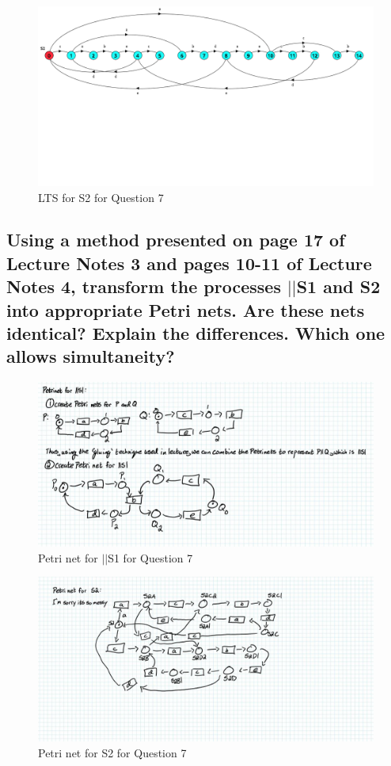 \documentclass{article}[8pt]
\renewcommand{\thesubsection}{\thesection.\alph{subsection}}
\begin{document}
\begin{figure}[H]
	\includegraphics[width=\linewidth]{./imgs/Question-7-ii.png}
	\caption{LTS for S2 for Question 7}
	\label{fig:Question-7-ii}
\end{figure}

\subsection[~\thesubsection]{Using a method presented on page 17 of Lecture Notes 3 and pages 10-11 of Lecture Notes 4, transform the processes $||$S1 and S2 into appropriate Petri nets. Are these nets identical? Explain the differences. Which one allows simultaneity?}

\begin{figure}[H]
	\includegraphics[width=\linewidth]{./imgs/Question-7-b-i.png}
	\caption{Petri net for $||$S1 for Question 7}
	\label{fig:Question-7-b-i}
\end{figure}

\begin{figure}[H]
	\includegraphics[width=\linewidth]{./imgs/Question-7-b-ii.png}
	\caption{Petri net for S2 for Question 7}
	\label{fig:Question-7-b-ii}
\end{figure}
\end{document}
